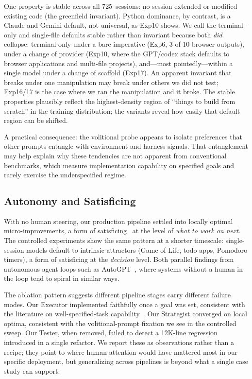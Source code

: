 \documentclass{article}
\begin{document}
One property is stable across all 725~sessions: no
session extended or modified existing code (the greenfield
invariant). Python dominance, by contrast, is a Claude-and-Gemini
default, not universal, as Exp10 shows. We call the terminal-only
and single-file defaults stable rather than invariant because
both \emph{did} collapse: terminal-only under a bare imperative
(Exp6, 3 of 10 browser outputs), under a change of provider
(Exp10, where the GPT/codex stack defaults to browser applications
and multi-file projects), and---most pointedly---within a single
model under a change of scaffold (Exp17). An apparent invariant
that breaks under one manipulation may break under others we did
not test; Exp16/17 is the case where we ran the manipulation and
it broke. The stable properties plausibly reflect the
highest-density region of ``things to build from scratch'' in
the training distribution; the variants reveal how easily
that default region can be shifted.

A practical consequence: the volitional probe appears to
isolate preferences that other prompts entangle with
environment and harness signals. That entanglement may help
explain why these tendencies are not apparent from
conventional benchmarks, which measure implementation
capability on specified goals and rarely exercise the
underspecified regime.

\subsection{Autonomy and Satisficing}

With no human steering, our production pipeline settled into
locally optimal micro-improvements, a form of
satisficing~\citep{simon1956} at the level of \emph{what to
work on next}. The controlled experiments show the same
pattern at a shorter timescale: single-session models default
to intrinsic attractors (Game of Life, todo apps, Pomodoro
timers), a form of satisficing at the \emph{decision} level.
Both parallel findings from autonomous agent loops such as
AutoGPT~\citep{significantgravitas2023autogpt}, where systems
without a human in the loop tend to spiral in similar ways.

The ablation pattern suggests different pipeline stages carry
different failure modes. Our Executor implemented faithfully
once a goal was set, consistent with the literature on
well-specified-task capability~\citep{swebenchpro2026}. Our
Strategist converged on local optima, consistent with the
volitional-prompt fixation we see in the controlled sweep.
Our Tester, when removed, failed to detect a 12K-line
regression introduced in a single refactor. We report these
as observations rather than a recipe; they point to where
human attention would have mattered most in our specific
deployment, but generalizing across pipelines is beyond what
a single case study can support.
\end{document}
